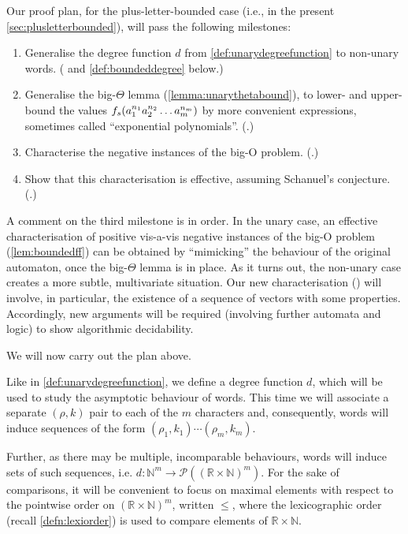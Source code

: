 \documentclass[10pt,a4paper]{amsart}
\numberwithin{equation}{section}
\theoremstyle{plain}
\theoremstyle{definition}
\theoremstyle{remark}
\newcommand\dgf{d}
\renewcommand\nu{f}
\newcommand*{\br}{\nobreak\discretionary{}{\hbox{}}{}}
\begin{document}
Our proof plan, for the plus-letter-bounded case (i.e., in the present \cref{sec:plusletterbounded}), will pass the following milestones:
\begin{enumerate}[1.]
\item Generalise the degree function $\dgf$ from \cref{def:unarydegreefunction} to non-unary words.
      ( and \cref{def:boundeddegree} below.)
\item Generalise the big-$\Theta$ lemma (\cref{lemma:unarythetabound}), to lower- and upper-bound
      the values $\nu_s(a_1^{n_1}a_2^{n_2}\br\dots a_m^{n_m})$ by more convenient expressions,
      sometimes called ``exponential polynomials''.
      (.)
\item Characterise the negative instances of the big-O problem.
      (.)
\item Show that this characterisation is effective, assuming Schanuel's conjecture.
      (.)
\end{enumerate}
A comment on the third milestone is in order. In the unary case,
an effective characterisation of positive vis-a-vis negative instances of the big-O problem
(\cref{lem:boundedff}) can be obtained by ``mimicking'' the behaviour
of the original automaton, once the big-$\Theta$ lemma is in place.
As it turns out, the non-unary case
creates a more subtle, multivariate situation. Our new characterisation
() will involve, in particular, the existence
of a sequence of vectors with some properties. Accordingly, new arguments will be required
(involving further automata and logic) to show algorithmic decidability.

We will now carry out the plan above.

Like in \cref{def:unarydegreefunction}, we define a degree function $\dgf$, which will be used to study
the asymptotic behaviour of words. This time we will associate a separate $(\rho,k)$ pair to each of the $m$ characters and, consequently,
words will induce sequences of the form $(\rho_1,k_1)\cdots(\rho_m,k_m)$.

Further, as there may be multiple, incomparable behaviours, words will induce sets of such sequences, i.e. $\dgf\colon \mathbb{N}^m \to \mathcal{P}( (\mathbb{R}\times \mathbb{N})^m)$.
For the sake of comparisons, it will be convenient to focus on maximal elements with respect to the pointwise order on $ (\mathbb{R} \times \mathbb{N})^m$, written $\le$,
where the lexicographic order (recall \cref{defn:lexiorder}) is used to compare elements of $\mathbb{R} \times \mathbb{N}$.
\end{document}
